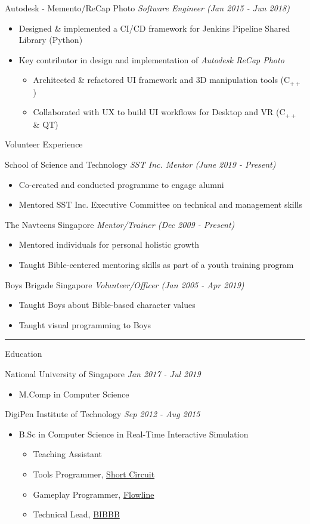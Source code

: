 \documentclass[letterpaper,11pt]{article}
\newcommand{\cvtitle}[1]{\huge\raggedright \textcolor{section_color}{#1}\\}
\newcommand{\cvhead}[1]{\large\raggedright \textcolor{subsection_color}{#1}\\}
\newcommand{\cvlist}[1]{\vspace{-12pt}\small \textcolor{item_color}{\begin{itemize}#1\end{itemize}}}
\newcommand{\cvli}[1]{\vspace{-4pt} \item{#1}}
\newcommand{\cvline}[0]{\noindent\rule{19cm}{0.4pt}}
\newcommand{\link}[2]{\textcolor{link_color}{\href{#1}{#2}}}
\newcommand{\qualifier}[1]{\hfill \textsl{\footnotesize #1}}
\begin{document}
\cvhead{Autodesk - Memento/ReCap Photo \qualifier{Software Engineer (Jan 2015 - Jun 2018)}}
\cvlist{
    \cvli{Designed \& implemented a CI/CD framework for Jenkins Pipeline Shared Library (Python)}
    \cvli{Key contributor in design and implementation of \textit{Autodesk ReCap Photo}
        \vspace{12pt}
        \cvlist{
            \cvli{Architected \& refactored UI framework and 3D manipulation tools (C$_{++}$)}
            \cvli{Collaborated with UX to build UI workflows for Desktop and VR (C$_{++}$ \& QT)}
        }
    }
}

\cvtitle{Volunteer Experience}

\cvhead{School of Science and Technology \qualifier{SST Inc. Mentor (June 2019 - Present)}}
\cvlist{
    \cvli{Co-created and conducted programme to engage alumni}
    \cvli{Mentored SST Inc. Executive Committee on technical and management skills}
}

\cvhead{The Navteens Singapore \qualifier{Mentor/Trainer (Dec 2009 - Present)}}
\cvlist{
    \cvli{Mentored individuals for personal holistic growth}
    \cvli{Taught Bible-centered mentoring skills as part of a youth training program}
}

\cvhead{Boys Brigade Singapore \qualifier{Volunteer/Officer (Jan 2005 - Apr 2019)}}
\cvlist{
    \cvli{Taught Boys about Bible-based character values}
    \cvli{Taught visual programming to Boys}
}

\vspace{-12pt}

\cvline

\cvtitle{Education}
\cvhead{National University of Singapore \qualifier{Jan 2017 - Jul 2019}}
\cvlist{
    \cvli{
        \cvhead{M.Comp in Computer Science}
    }
}

\cvhead{DigiPen Institute of Technology \qualifier{Sep 2012 - Aug 2015}}
\cvlist{
    \cvli{
        \cvhead{B.Sc in Computer Science in Real-Time Interactive Simulation}
        \cvlist{
            \cvli{Teaching Assistant}
            \cvli{Tools Programmer, \link{http://games.digipen.edu/games/shortcircuit}{Short Circuit}}
            \cvli{Gameplay Programmer, \link{http://games.digipen.edu/games/flowline}{Flowline}}
            \cvli{Technical Lead, \link{http://games.digipen.edu/games/bibbb}{BIBBB}}
        }
    }
}
\end{document}
